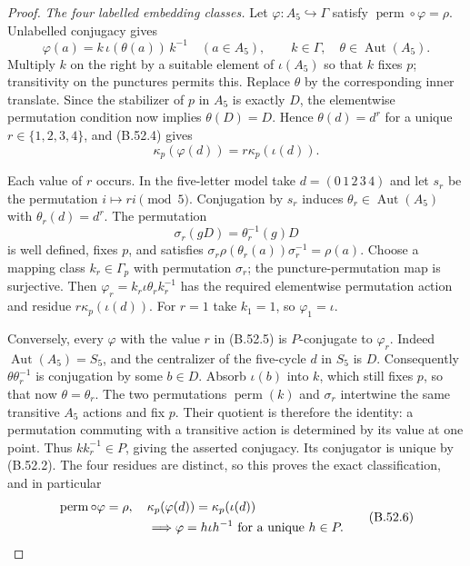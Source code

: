 \begin{proof}
\emph{The four labelled embedding classes.}
Let $\varphi:A_5\hookrightarrow\Gamma$ satisfy
$\operatorname{perm}\circ\varphi=\rho$.
Unlabelled conjugacy gives
\[
 \varphi(a)=k\,\iota(\theta(a))\,k^{-1}
 \quad(a\in A_5),
 \qquad k\in\Gamma,\quad\theta\in\operatorname{Aut}(A_5).
\]
Multiply $k$ on the right by a suitable element of
$\iota(A_5)$ so that $k$ fixes $p$; transitivity on the
punctures permits this.  Replace $\theta$ by the corresponding
inner translate.  Since the stabilizer of $p$ in $A_5$ is
exactly $D$, the elementwise permutation condition now implies
$\theta(D)=D$.  Hence $\theta(d)=d^r$ for a unique
$r\in\{1,2,3,4\}$, and (B.52.4) gives
\[
 \kappa_p(\varphi(d))=r\kappa_p(\iota(d)).
 \tag{B.52.5}
\]

Each value of $r$ occurs.  In the five-letter model take
$d=(0\,1\,2\,3\,4)$ and let $s_r$ be the permutation
$i\mapsto ri\pmod5$.  Conjugation by $s_r$ induces
$\theta_r\in\operatorname{Aut}(A_5)$ with
$\theta_r(d)=d^r$.  The permutation
\[
 \sigma_r(gD)=\theta_r^{-1}(g)D
\]
is well defined, fixes $p$, and satisfies
$\sigma_r\rho(\theta_r(a))\sigma_r^{-1}=\rho(a)$.
Choose a mapping class $k_r\in\Gamma_p$ with permutation
$\sigma_r$; the puncture-permutation map is surjective.
Then $\varphi_r=k_r\iota\theta_r k_r^{-1}$ has the required
elementwise permutation action and residue
$r\kappa_p(\iota(d))$.
For $r=1$ take $k_1=1$, so $\varphi_1=\iota$.

Conversely, every $\varphi$ with the value $r$ in (B.52.5)
is $P$-conjugate to $\varphi_r$.
Indeed $\operatorname{Aut}(A_5)=S_5$, and the centralizer
of the five-cycle $d$ in $S_5$ is $D$.
Consequently $\theta\theta_r^{-1}$ is conjugation by
some $b\in D$.  Absorb $\iota(b)$ into $k$, which still
fixes $p$, so that now $\theta=\theta_r$.
The two permutations $\operatorname{perm}(k)$ and $\sigma_r$
intertwine the same transitive $A_5$ actions and fix $p$.
Their quotient is therefore the identity: a permutation
commuting with a transitive action is determined by its
value at one point.  Thus $k k_r^{-1}\in P$, giving the
asserted conjugacy.  Its conjugator is unique by (B.52.2).
The four residues are distinct, so this proves the exact
classification, and in particular
\[
 \begin{split}
 &\operatorname{perm}\circ\varphi=\rho,\quad
   \kappa_p(\varphi(d))=\kappa_p(\iota(d))\\
 &\hspace{25mm}\Longrightarrow
   \varphi=h\iota h^{-1}\text{ for a unique }h\in P.
 \end{split}
 \tag{B.52.6}
\]


\end{proof}
